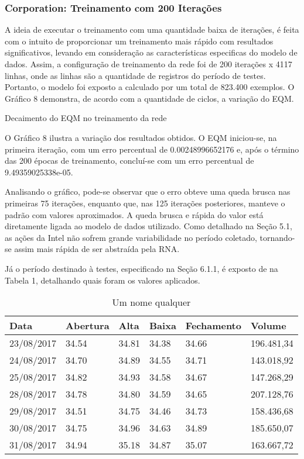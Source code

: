 \subsubsection{Corporation: Treinamento com 200 Iterações}	
A ideia de executar o treinamento com uma quantidade baixa de iterações, é feita com o intuito de proporcionar um treinamento mais rápido com resultados significativos, levando em consideração as características especificas do modelo de dados. Assim, a configuração de treinamento da rede foi de 200 iterações x 4117 linhas, onde as linhas são a quantidade de registros do período de testes. Portanto, o modelo foi exposto a calculado por um total de 823.400 exemplos. O Gráfico 8 demonstra, de acordo com a quantidade de ciclos, a variação do EQM.
\begin{grafico}[h]
	\centering
	\caption{Decaimento do EQM no treinamento da rede}
	\label{lingua}
\end{grafico}

O Gráfico 8 ilustra a variação dos resultados obtidos. O EQM iniciou-se, na primeira iteração, com um erro percentual de 0.00248996652176 e, após o término das 200 épocas de treinamento, concluí-se com um erro percentual de 9.49359025338e-05.

Analisando o gráfico, pode-se observar que o erro obteve uma queda brusca nas primeiras 75 iterações, enquanto que, nas 125 iterações posteriores, manteve o padrão com valores aproximados. A queda brusca e rápida do valor está diretamente ligada ao modelo de dados utilizado. Como detalhado na Seção 5.1, as ações da Intel não sofrem grande variabilidade no período coletado, tornando-se assim mais rápida de ser abstraída pela RNA.

Já o período destinado à testes, especificado na Seção 6.1.1, é exposto de na Tabela 1, detalhando quais foram os valores aplicados.
\begin{table}[h]
\centering
\caption{Um nome qualquer}
\vspace{0.5cm}
\begin{tabular}{llllll}  
\toprule
Data    & Abertura   & Alta   & Baixa   & Fechamento   & Volume\\
\midrule
23/08/2017 & 34.54 & 34.81 & 34.38 & 34.66 & 196.481,34\\
24/08/2017 & 34.70 & 34.89 & 34.55 & 34.71 & 143.018,92\\
25/08/2017 & 34.82 & 34.93 & 34.58 & 34.67 & 147.268,29\\
28/08/2017 & 34.78 & 34.80 & 34.59 & 34.65 & 207.128,76\\
29/08/2017 & 34.51 & 34.75 & 34.46 & 34.73 & 158.436,68\\
30/08/2017 & 34.75 & 34.96 & 34.63 & 34.89 & 185.650,07\\
31/08/2017 & 34.94 & 35.18 & 34.87 & 35.07 & 163.667,72\\
\bottomrule
\end{tabular}
\end{table}

